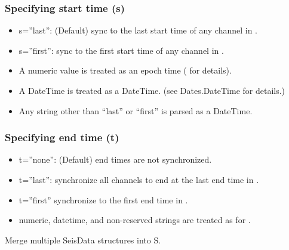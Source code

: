 \documentclass[letterpaper,11pt,english]{sphinxmanual}
\begin{document}
\subsubsection{Specifying start time (s)}
\label{\detokenize{src/Processing/processing:specifying-start-time-s}}\begin{itemize}
\item {} 
s=”last”: (Default) sync to the last start time of any channel in .

\item {} 
s=”first”: sync to the first start time of any channel in .

\item {} 
A numeric value is treated as an epoch time ( for details).

\item {} 
A DateTime is treated as a DateTime. (see Dates.DateTime for details.)

\item {} 
Any string other than “last” or “first” is parsed as a DateTime.

\end{itemize}


\subsubsection{Specifying end time (t)}
\label{\detokenize{src/Processing/processing:specifying-end-time-t}}\begin{itemize}
\item {} 
t=”none”: (Default) end times are not synchronized.

\item {} 
t=”last”: synchronize all channels to end at the last end time in .

\item {} 
t=”first” synchronize to the first end time in .

\item {} 
numeric, datetime, and non-reserved strings are treated as for .

\end{itemize}


\begin{fulllineitems}
\end{fulllineitems}


Merge multiple SeisData structures into S.
\end{document}
